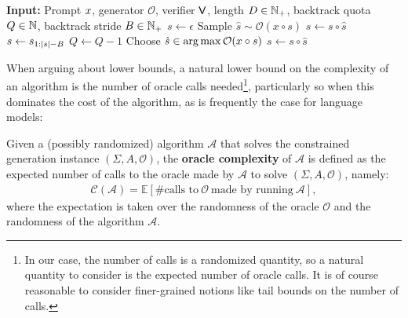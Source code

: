 \begin{algorithm}
\caption{\algoName}
\label{alg:sampling_with_backtracking}
\begin{algorithmic}[1]
\STATE \textbf{Input:} Prompt $x$, generator $\mathcal{O}$, verifier $\mathsf{V}$, length $D \in \mathbb{N}_+$, backtrack quota $Q \in \mathbb{N}$, backtrack stride $B \in \mathbb{N}_+$
\STATE $s \gets \epsilon$
    \STATE Sample $\hat{s} \sim \mathcal{O}(x \circ s)$
    \STATE $s \gets s \circ \hat{s}$
        \STATE $s \gets s_{1 : \left| s \right| - B}$
        \STATE $Q \gets Q - 1$
            \STATE Choose $\hat{s} \in \operatorname*{arg\,max} \mathcal{O}(x \circ s)$
            \STATE $s \gets s \circ \hat{s}$
        \ENDFOR
    \ENDIF
\ENDWHILE
\end{algorithmic}
\end{algorithm}


When arguing about lower bounds, a natural lower bound on the complexity of an algorithm is the number of oracle calls needed\footnote{In our case, the number of calls is a randomized quantity, so a natural quantity to consider is the expected number of oracle calls. It is of course reasonable to consider finer-grained notions like tail bounds on the number of calls.}, particularly so when this dominates the cost of the algorithm, as is frequently the case for language models: 
\begin{definition}
    \label{def:oracle_complexity}
    Given a (possibly randomized) algorithm $\mathcal{A}$ that solves the constrained generation instance $(\Sigma, A, \mathcal{O})$, the \textbf{oracle complexity} of $\mathcal{A}$ is defined as the expected number of calls to the oracle made by $\mathcal{A}$ to solve $(\Sigma, A, \mathcal{O})$, namely:
    \begin{align*}
        \mathcal{C}(\mathcal{A}) = \mathbb{E}[\# \text{calls to} \ \mathcal{O} \ \text{made by running} \ \mathcal{A}],
    \end{align*}
    where the expectation is taken over the randomness of the oracle $\mathcal{O}$ and the randomness of the algorithm $\mathcal{A}$.
\end{definition}


